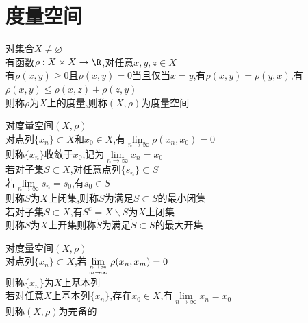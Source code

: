 

%

\setcounter{section}{0}
\setcounter{subsection}{0}

\chapter{度量空间}

\begin{dingyi}
对集合$X\neq \varnothing$\\
有函数$\rho:X\times X\to \R$,对任意$x,y,z\in X$\\
有$\rho(x,y)\geq 0$且$\rho(x,y)=0$当且仅当$x=y$,有$\rho(x,y)=\rho(y,x)$,有$\rho(x,y)\leq \rho(x,z)+\rho(z,y)$\\
则称$\rho$为$X$上的度量,则称$(X,\rho)$为度量空间
\end{dingyi}

\begin{dingyi}
对度量空间$(X,\rho)$\\
对点列$\{x_n\}\subset X$和$x_0\in X$,有$\lim\limits_{n\to \infty}\rho(x_n,x_0)=0$\\
则称$\{x_n\}$收敛于$x_0$,记为$\lim\limits_{n\to\infty}x_n=x_0$\\
若对子集$S\subset X$,对任意点列$\{s_n\}\subset S$\\
若$\lim\limits_{n\to\infty}s_n=s_0$,有$s_0\in S$\\
则称$S$为$X$上闭集,则称$\overline{S}$为满足$S\subset \overline{S}$的最小闭集\\
若对子集$S\subset X$,有$S^{c}=X\backslash S$为$X$上闭集\\
则称$S$为$X$上开集则称$\mathring{S}$为满足$\mathring{S}\subset S$的最大开集
\end{dingyi}

\begin{dingyi}
对度量空间$(X,\rho)$\\
对点列$\{x_n\}\subset X$,若$\lim\limits_{n\to\infty\atop m\to\infty}\rho(x_n,x_m)=0$\\
则称$\{x_n\}$为$X$上基本列\\
若对任意$X$上基本列$\{x_n\}$,存在$x_0\in X$,有$\lim\limits_{n\to\infty}x_n=x_0$\\
则称$(X,\rho)$为完备的
\end{dingyi}

